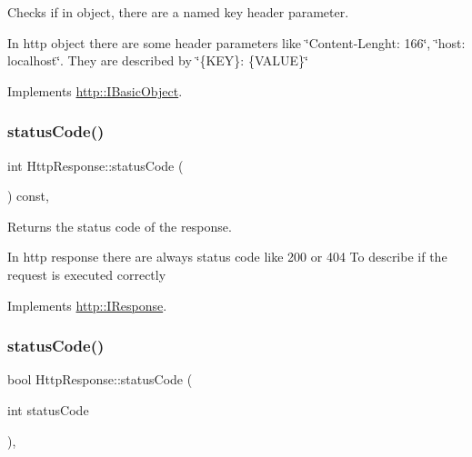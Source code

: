 Checks if in object, there are a named \textquotesingle{}key\textquotesingle{} header parameter. 

In http object there are some header parameters like \char`\"{}\+Content-\/\+Lenght\+: 166\char`\"{}, \char`\"{}host\+: localhost\char`\"{}. They are described by \char`\"{}\{\+K\+E\+Y\}\+: \{\+V\+A\+L\+U\+E\}\char`\"{} 

Implements \hyperlink{structhttp_1_1IBasicObject_a581e48c03a666b87082c75427f0ff835}{http\+::\+I\+Basic\+Object}.

\mbox{\label{classHttpResponse_a5cb28c82fc2f657808b61f0f6bb67f28}} 
\subsubsection{\texorpdfstring{status\+Code()}{statusCode()}\hspace{0.1cm}{\footnotesize\ttfamily [1/2]}}
{\footnotesize\ttfamily int Http\+Response\+::status\+Code (\begin{DoxyParamCaption}{ }\end{DoxyParamCaption}) const\hspace{0.3cm}{\ttfamily [virtual]}, {\ttfamily [noexcept]}}



Returns the status code of the response. 

In http response there are always status code like 200 or 404 To describe if the request is executed correctly 

Implements \hyperlink{structhttp_1_1IResponse_ad980a7a0b5f1de80bd1faa84706e922f}{http\+::\+I\+Response}.

\mbox{\label{classHttpResponse_a8a6cc8f27e81ca4d2ef4ec60450974d1}} 
\subsubsection{\texorpdfstring{status\+Code()}{statusCode()}\hspace{0.1cm}{\footnotesize\ttfamily [2/2]}}
{\footnotesize\ttfamily bool Http\+Response\+::status\+Code (\begin{DoxyParamCaption}\item[{int}]{status\+Code }\end{DoxyParamCaption})\hspace{0.3cm}{\ttfamily [virtual]}, {\ttfamily [noexcept]}}



